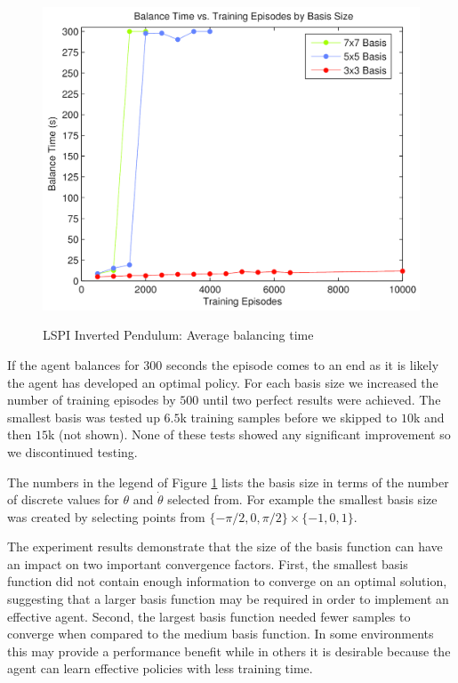 \begin{figure}
	\centering
		\includegraphics[width=0.33\paperheight]{Balance_vs_Samples.png}
	\label{fig:pendulum}
    \caption{LSPI Inverted Pendulum: Average balancing time}
\end{figure}

If the agent balances for $300$ seconds the episode comes to an end as it is likely the agent has developed an optimal policy. For each basis size we increased the number of training episodes by $500$ until two perfect results were achieved. The smallest basis was tested up $6.5$k training samples before we skipped to $10$k and then $15$k (not shown). None of these tests showed any significant improvement so we discontinued testing.

The numbers in the legend of Figure \ref{fig:pendulum} lists the basis size in terms of the number of discrete values for $\theta$ and $\dot{\theta}$ selected from. For example the smallest basis size was created by selecting points from $\{-\pi/2, 0, \pi/2\} \times \{-1, 0, 1\}$.

The experiment results demonstrate that the size of the basis function can have an impact on two important convergence factors. First, the smallest basis function did not contain enough information to converge on an optimal solution, suggesting that a larger basis function may be required in order to implement an effective agent. Second, the largest basis function needed fewer samples to converge when compared to the medium basis function. In some environments this may provide a performance benefit while in others it is desirable because the agent can learn effective policies with less training time.

